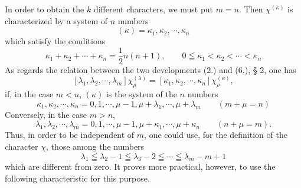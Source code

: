 \documentclass[11pt]{article}
\begin{document}
In order to obtain the $k$ different characters, we must put $m=n$. Then $\chi^{(\kappa)}$ is characterized by a system of $n$ numbers
\begin{equation}\tag{1.}
 (\kappa)=\kappa_1,
\kappa_2,
\cdots,
\kappa_n
\end{equation}
which satisfy the conditions
\begin{equation}\tag{2.}
 \kappa_1+
\kappa_2+\cdots+
\kappa_n=\frac12n(n+1),\qquad 0\leqq\kappa_1<\kappa_2<\cdots<\kappa_n
\end{equation}
As regards the relation between the two developments (2.) and (6.), § 2, one has
\[
 [\lambda_1,
\lambda_2,
\cdots,
\lambda_m]\chi_\rho^{(\lambda)}=[\kappa_1,
\kappa_2,
\cdots,
\kappa_n]\chi_\rho^{(\kappa)},
\]
if, in the case $m<n$, $(\kappa)$ is the system of the $n$ numbers
\begin{equation}\tag{3.}
 \kappa_1,
\kappa_2,
\cdots,
\kappa_n=0,1,
\cdots,
\mu-1,
\mu+
\lambda_1,
\cdots,
\mu+
\lambda_m\qquad(m+
\mu=n)
\end{equation}
Conversely, in the case $m>n$,
\begin{equation}\tag{4.}
 \lambda_1,
\lambda_2,
\cdots,
\lambda_m=0,1,
\cdots,
\mu-1,
\mu+
\kappa_1,
\cdots,
\mu+
\kappa_n\qquad(n+
\mu=m).
\end{equation}
Thus, in order to be independent of $m$, one could use, for the definition of the character $\chi$, those among the numbers
\[
 \lambda_1\leqq\lambda_2-1\leqq\lambda_3-2\leqq\cdots\leqq\lambda_m-m+1
\]
which are different from zero. It proves more practical, however, to use the following characteristic for this purpose.
\end{document}
